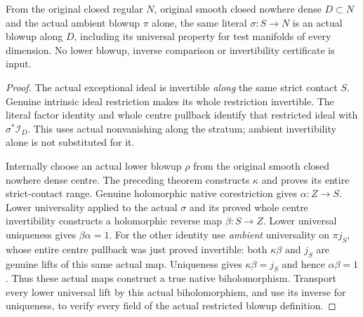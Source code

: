\begin{theorem}
\label{hir:actual-closed-contact-full-restricted-blowup}
\leanok
From the original closed regular $N$, original smooth closed nowhere
dense $D\subset N$ and the actual ambient blowup $\pi$ alone,
the same literal $\sigma:S\to N$ is an actual blowup along $D$,
including its universal property for test manifolds of every dimension.
No lower blowup, inverse comparison or invertibility certificate is input.
\end{theorem}
\begin{proof}
The actual exceptional ideal is invertible \emph{along} the same strict
contact $S$. Genuine intrinsic ideal restriction makes its whole
restriction invertible. The literal factor identity and whole centre
pullback identify that restricted ideal with $\sigma^*\mathcal I_D$.
This uses actual nonvanishing along the stratum; ambient invertibility
alone is not substituted for it.

Internally choose an actual lower blowup $\rho$ from the original smooth
closed nowhere dense centre. The preceding theorem constructs $\kappa$
and proves its entire strict-contact range. Genuine holomorphic native
corestriction gives $\alpha:Z\to S$. Lower universality applied to
the actual $\sigma$ and its proved whole centre invertibility constructs
a holomorphic reverse map $\beta:S\to Z$. Lower universal uniqueness
gives $\beta\alpha=1$. For the other identity use \emph{ambient}
universality on $\pi j_S$, whose entire centre pullback was just proved
invertible: both $\kappa\beta$ and $j_S$ are genuine lifts of this
same actual map. Uniqueness gives $\kappa\beta=j_S$ and hence
$\alpha\beta=1$. Thus these actual maps construct a true native
biholomorphism. Transport every lower universal lift by this actual
biholomorphism, and use its inverse for uniqueness, to verify every
field of the actual restricted blowup definition.
\end{proof}

